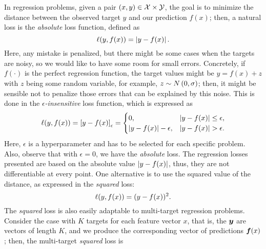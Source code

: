 In regression problems, given a pair $(x, y) \in \mathcal{X} \times \mathcal{Y}$, the goal is to minimize the distance between the observed target $y$ and our prediction $f(x)$; then, a natural loss is the \emph{absolute} loss function, defined as 
\begin{equation}
    \label{eq:abs_def}
    \lossf(y, f(x)) = \abs{y - f(x)}.
\end{equation}
Here, any mistake is penalized, but there might be some cases when the targets are noisy, so we would like to have some room for small errors. Concretely, if $f(\cdot)$ is the perfect regression function, the target values might be $y = f(x) + z$ with $z$ being some random variable, for example, $z \sim N \left(0, \sigma\right)$; then, it might be sensible not to penalize those errors that can be explained by this noise. This is done in the \emph{$\epsilon$-insensitive} loss function, which is expressed as 
\begin{equation}
    \label{eq:epsins_def}
    \lossf(y, f(x)) =  \epsins{y - f(x)} =
    \begin{cases}
        0, & \abs{y - f(x)} \leq \epsilon ,\\
        \abs{y - f(x)} - \epsilon, & \abs{y - f(x)} > \epsilon .\\
    \end{cases}
\end{equation} 
Here, $\epsilon$ is a hyperparameter and has to be selected for each specific problem. Also, observe that with $\epsilon =0$, we have the \emph{absolute} loss.
%
The regression losses presented are based on the absolute value $\left|y - f(x)\right|$, thus, they are not differentiable at every point. One alternative is to use the squared value of the distance, as expressed in the \emph{squared} loss:
\begin{equation}
    \label{eq:sq_def}
    \lossf(y, f(x)) = (y - f(x))^2.
\end{equation}
The \emph{squared} loss is also easily adaptable to multi-target regression problems. Consider the case with $K$ targets for each feature vector $x$, that is, the $\bm{y}$ are vectors of length $K$, and we produce the corresponding vector of predictions $\bm{f}(x)$; then, the multi-target \emph{squared} loss is
